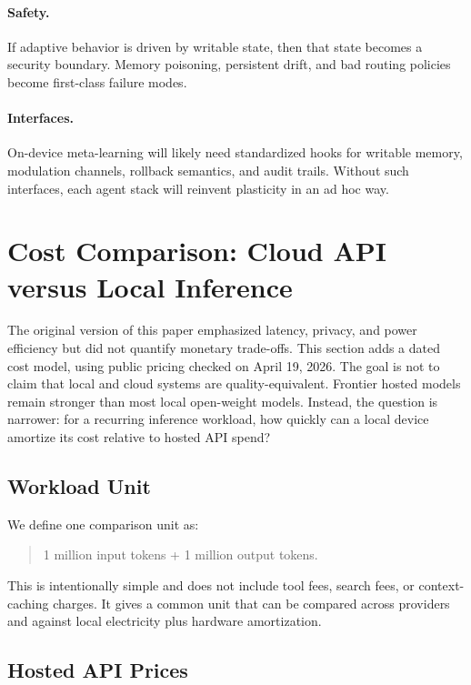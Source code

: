 \documentclass[11pt,a4paper]{article}
\begin{document}
\paragraph{Safety.}
If adaptive behavior is driven by writable state, then that state becomes a security boundary. Memory poisoning, persistent drift, and bad routing policies become first-class failure modes.

\paragraph{Interfaces.}
On-device meta-learning will likely need standardized hooks for writable memory, modulation channels, rollback semantics, and audit trails. Without such interfaces, each agent stack will reinvent plasticity in an ad hoc way.

\section{Cost Comparison: Cloud API versus Local Inference}

The original version of this paper emphasized latency, privacy, and power efficiency but did not quantify monetary trade-offs. This section adds a dated cost model, using public pricing checked on April 19, 2026. The goal is not to claim that local and cloud systems are quality-equivalent. Frontier hosted models remain stronger than most local open-weight models. Instead, the question is narrower: for a recurring inference workload, how quickly can a local device amortize its cost relative to hosted API spend?

\subsection{Workload Unit}

We define one comparison unit as:
\begin{quote}
1 million input tokens + 1 million output tokens.
\end{quote}

This is intentionally simple and does not include tool fees, search fees, or context-caching charges. It gives a common unit that can be compared across providers and against local electricity plus hardware amortization.

\subsection{Hosted API Prices}
\end{document}
